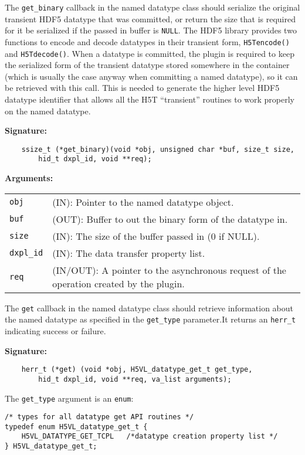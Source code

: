 The {\tt get\_binary} callback in the named datatype class should
serialize the original transient HDF5 datatype that was committed, or
return the size that is required for it be serialized if the passed in
buffer is {\tt NULL}. The HDF5 library provides two functions to
encode and decode datatypes in their transient form, {\tt H5Tencode()}
and {\tt H5Tdecode()}. When a datatype is committed, the plugin is
required to keep the serialized form of the transient datatype stored
somewhere in the container (which is usually the case anyway when
committing a named datatype), so it can be retrieved with this
call. This is needed to generate the higher level HDF5 datatype
identifier that allows all the H5T ``transient'' routines to work
properly on the named datatype.

\textbf{Signature:}
\begin{lstlisting}
    ssize_t (*get_binary)(void *obj, unsigned char *buf, size_t size, 
        hid_t dxpl_id, void **req);
\end{lstlisting}

\textbf{Arguments:}\\
\begin{tabular}{l p{10cm}}
  {\tt obj} & (IN): Pointer to the named datatype object.\\
  {\tt buf} & (OUT): Buffer to out the binary form of the datatype in.\\
  {\tt size} & (IN): The size of the buffer passed in (0 if NULL).\\
  {\tt dxpl\_id} & (IN): The data transfer property list.\\
  {\tt req} & (IN/OUT): A pointer to the asynchronous request of the
  operation created by the plugin.\\
\end{tabular}

The {\tt get} callback in the named datatype class should retrieve
information about the named datatype as specified in the {\tt get\_type}
parameter.It returns an {\tt herr\_t} indicating success or failure.

\textbf{Signature:}
\begin{lstlisting}
    herr_t (*get) (void *obj, H5VL_datatype_get_t get_type, 
        hid_t dxpl_id, void **req, va_list arguments);
\end{lstlisting}

The {\tt get\_type} argument is an {\tt enum}:
\begin{lstlisting}
/* types for all datatype get API routines */
typedef enum H5VL_datatype_get_t {
    H5VL_DATATYPE_GET_TCPL   /*datatype creation property list */
} H5VL_datatype_get_t;
\end{lstlisting}

